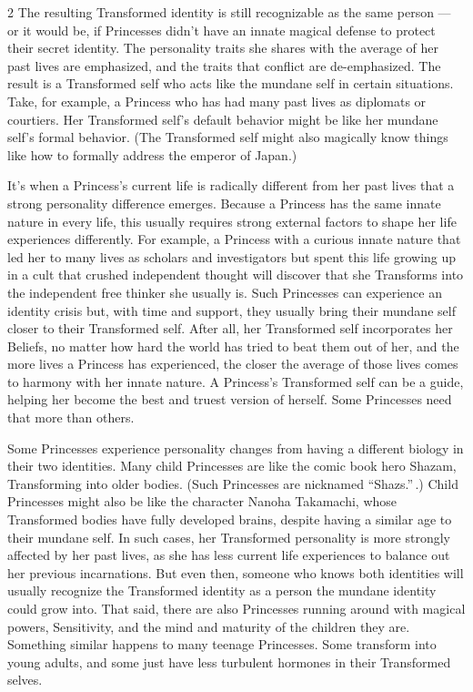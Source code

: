 \begin{multicols}{2}
The resulting Transformed identity is still recognizable as the same person — or it would be, if Princesses didn't have an innate magical defense to protect their secret identity. The personality traits she shares with the average of her past lives are emphasized, and the traits that conflict are de-emphasized. The result is a Transformed self who acts like the mundane self in certain situations. Take, for example, a Princess who has had many past lives as diplomats or courtiers. Her Transformed self's default behavior might be like her mundane self's formal behavior. (The Transformed self might also magically know things like how to formally address the emperor of Japan.)

It's when a Princess's current life is radically different from her past lives that a strong personality difference emerges. Because a Princess has the same innate nature in every life, this usually requires strong external factors to shape her life experiences differently. For example, a Princess with a curious innate nature that led her to many lives as scholars and investigators but spent this life growing up in a cult that crushed independent thought will discover that she Transforms into the independent free thinker she usually is. Such Princesses can experience an identity crisis but, with time and support, they usually bring their mundane self closer to their Transformed self. After all, her Transformed self incorporates her Beliefs, no matter how hard the world has tried to beat them out of her, and the more lives a Princess has experienced, the closer the average of those lives comes to harmony with her innate nature. A Princess's Transformed self can be a guide, helping her become the best and truest version of herself. Some Princesses need that more than others. 

Some Princesses experience personality changes from having a different biology in their two identities. Many child Princesses are like the comic book hero Shazam, Transforming into older bodies. (Such Princesses are nicknamed \textquotedblleft Shazs.\textquotedblright\,.) Child Princesses might also be like the character  Nanoha Takamachi, whose Transformed bodies have fully developed brains, despite having a similar age to their mundane self. In such cases, her Transformed personality is more strongly affected by her past lives, as she has less current life experiences to balance out her previous incarnations. But even then, someone who knows both identities will usually recognize the Transformed identity as a person the mundane identity could grow into. That said, there are also Princesses running around with magical powers, Sensitivity, and the mind and maturity of the children they are. Something similar happens to many teenage Princesses. Some transform into young adults, and some just have less turbulent hormones in their Transformed selves. 


\end{multicols}
